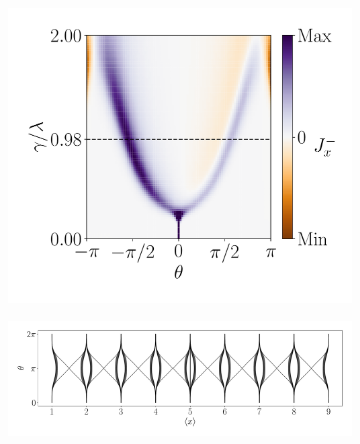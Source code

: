 \begin{figure}[h!]
\begin{minipage}[h!]{1\textwidth}
\begin{subfigure}[b!]{0.35 \textwidth}
         \end{subfigure}\hspace*{-0.5em}
         \begin{subfigure}[b!]{0.35 \textwidth}
             \caption{}
             \includegraphics[width=\textwidth]{Imagenes/Resultados_pump_Cuadrado/xy/current_square_pump_neg.pdf}
         \end{subfigure}\hspace*{-0.5em}
     \end{minipage}\vspace*{-1em}
     
     
     \begin{minipage}[h!]{1\textwidth}
         \begin{subfigure}[b!]{1.0 \textwidth}
             \caption{}
             \includegraphics[width=\textwidth]{Imagenes/Resultados_pump_Cuadrado/xy/wannier_centerx.pdf}
         \end{subfigure}\hspace*{-0.5em}
     \end{minipage}\vspace*{-1em}


\end{figure}
